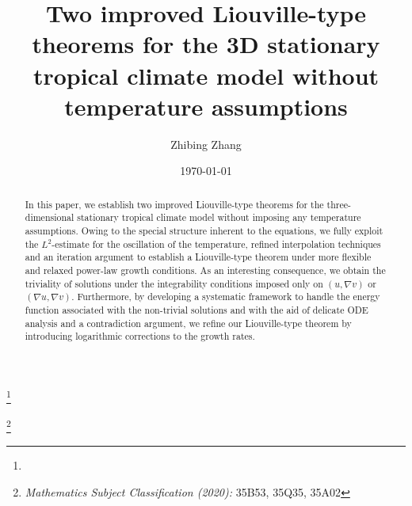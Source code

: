 \documentclass[11pt,reqno]{amsart}
\date{\today}
\def\subjclass#1{{\renewcommand{\thefootnote}{}%
\footnote{\emph{Mathematics Subject Classification (2020):} #1}}}
\numberwithin{Thm}{section}
\begin{document}
\large

\title[Liouville-type theorems]
{Two improved Liouville-type theorems for the 3D stationary tropical climate model without temperature assumptions}


\author{Zhibing Zhang}

\address{Zhibing Zhang: School of Mathematics and Statistics, Key Laboratory of Modeling, Simulation and Control of Complex Ecosystem in Dabie Mountains of Anhui Higher Education Institutes, Anqing Normal University, Anqing 246133, China}
%

\thanks{}




\subjclass{35B53, 35Q35, 35A02}

\begin{abstract}
In this paper, we establish two improved Liouville-type theorems for the three-dimensional stationary tropical climate model without imposing any temperature assumptions. Owing to the special structure inherent to the equations, we fully exploit the $L^2$-estimate for the oscillation of the temperature, refined interpolation techniques and an iteration argument to establish a Liouville-type theorem under more flexible and relaxed power-law growth conditions. As an interesting consequence, we obtain the triviality of solutions under the integrability conditions imposed only on $(u,\nabla v)$ or $(\nabla u,\nabla v)$. Furthermore, by developing a systematic framework to handle the energy function associated with the non-trivial solutions and with the aid of delicate ODE analysis and a contradiction argument, we refine our Liouville-type theorem by introducing logarithmic corrections to the growth rates.
\end{abstract}
\maketitle

\end{document}
